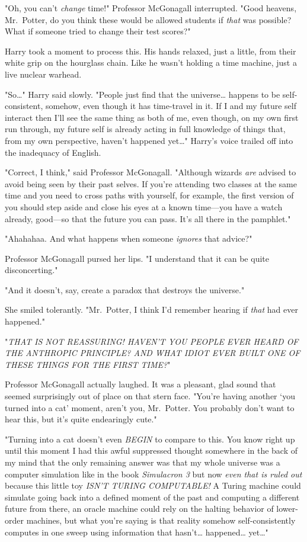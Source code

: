 "Oh, you can't \emph{change} time!" Professor McGonagall interrupted. "Good
heavens, Mr.~Potter, do you think these would be allowed students if
\emph{that} was possible? What if someone tried to change their test scores?"

Harry took a moment to process this. His hands relaxed, just a little, from
their white grip on the hourglass chain. Like he wasn't holding a time machine,
just a live nuclear warhead.

"So{\ldots}" Harry said slowly. "People just find that the universe{\ldots}
happens to be self-consistent, somehow, even though it has time-travel in it.
If I and my future self interact then I'll see the same thing as both of me,
even though, on my own first run through, my future self is already acting in
full knowledge of things that, from my own perspective, haven't happened
yet{\ldots}" Harry's voice trailed off into the inadequacy of English.

"Correct, I think," said Professor McGonagall. "Although wizards \emph{are}
advised to avoid being seen by their past selves. If you're attending two
classes at the same time and you need to cross paths with yourself, for
example, the first version of you should step aside and close his eyes at a
known time---you have a watch already, good---so that the future you can pass.
It's all there in the pamphlet."

"Ahahahaa. And what happens when someone \emph{ignores} that advice?"

Professor McGonagall pursed her lips. "I understand that it can be quite
disconcerting."

"And it doesn't, say, create a paradox that destroys the universe."

She smiled tolerantly. "Mr.~Potter, I think I'd remember hearing if \emph{that}
had ever happened."

"\emph{THAT IS NOT REASSURING! HAVEN'T YOU PEOPLE EVER HEARD OF THE ANTHROPIC
PRINCIPLE? AND WHAT IDIOT EVER BUILT ONE OF THESE THINGS FOR THE FIRST TIME?}"

Professor McGonagall actually laughed. It was a pleasant, glad sound that
seemed surprisingly out of place on that stern face. "You're having another
`you turned into a cat' moment, aren't you, Mr.~Potter. You probably don't want
to hear this, but it's quite endearingly cute."

"Turning into a cat doesn't even \emph{BEGIN} to compare to this. You know
right up until this moment I had this awful suppressed thought somewhere in the
back of my mind that the only remaining answer was that my whole universe was a
computer simulation like in the book \emph{Simulacron 3} but now \emph{even
that is ruled out} because this little toy \emph{ISN'T TURING COMPUTABLE!} A
Turing machine could simulate going back into a defined moment of the past and
computing a different future from there, an oracle machine could rely on the
halting behavior of lower-order machines, but what you're saying is that
reality somehow self-consistently computes in one sweep using information that
hasn't{\ldots} happened{\ldots} yet{\ldots}"

